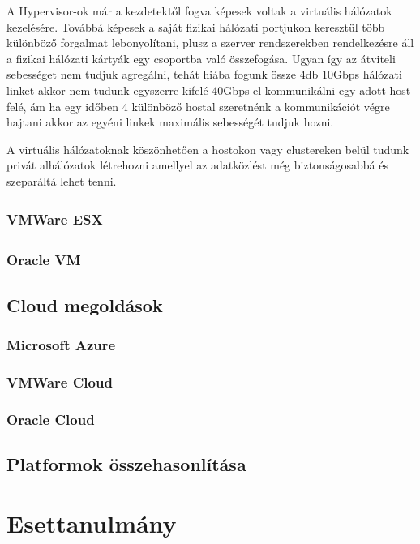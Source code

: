 \documentclass[12pt,oneside,justify,table]{book}
\begin{document}
A Hypervisor-ok már a kezdetektől fogva képesek voltak a virtuális hálózatok kezelésére. Továbbá képesek a saját fizikai hálózati portjukon keresztül több különböző forgalmat lebonyolítani, plusz a szerver rendszerekben rendelkezésre áll a fizikai hálózati kártyák egy csoportba való összefogása. Ugyan így az átviteli sebességet nem tudjuk agregálni, tehát hiába fogunk össze 4db 10Gbps hálózati linket akkor nem tudunk egyszerre kifelé 40Gbps-el kommunikálni egy adott host felé, ám ha egy időben 4 különböző hostal szeretnénk a kommunikációt végre hajtani akkor az egyéni linkek maximális sebességét tudjuk hozni. 

A virtuális hálózatoknak köszönhetően a hostokon vagy clustereken belül tudunk privát alhálózatok létrehozni amellyel az adatközlést még biztonságosabbá és szeparáltá lehet tenni.

\subsection{VMWare ESX \textsuperscript{\textregistered}}


\subsection{Oracle\textsuperscript{\textregistered} VM}


\section{Cloud megoldások}
\subsection{Microsoft Azure}
\cite{AzureFundamentals}


\subsection{VMWare Cloud}


\subsection{Oracle Cloud}


\section{Platformok összehasonlítása}


\chapter{Esettanulmány}
\end{document}
